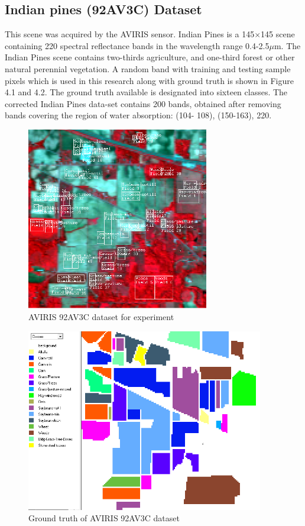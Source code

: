 \documentclass[document.tex]{subfiles}
\begin{document}
\subsection{Indian pines (92AV3C) Dataset}
\noindent This scene was acquired by the AVIRIS sensor. Indian Pines is a 145$\times$145 scene containing
220 spectral reflectance bands in the wavelength range 0.4-2.5$\mu$m. The Indian Pines scene
contains two-thirds agriculture, and one-third forest or other natural perennial vegetation.
A random band with training and testing sample pixels which is used in this research along with ground truth is shown in Figure 4.1 and 4.2. The ground truth
available is designated into sixteen classes. The corrected Indian Pines data-set contains
200 bands, obtained after removing bands covering the region of water absorption: (104-
108), (150-163), 220.
\begin{figure}[H]
	\begin{center}
		\includegraphics[height=8.0cm]{imgs/Dataset.png}
	\end{center}
	\caption{AVIRIS 92AV3C dataset for experiment}
	\label{fig:AVIRIS 92AV3C dataset for experiment}
\end{figure}

\begin{figure}[H]
	\begin{center}
		\includegraphics[height=8.0cm]{imgs/Ground.png}
	\end{center}
	\caption{Ground truth of AVIRIS 92AV3C dataset}
	\label{fig:Ground truth of AVIRIS 92AV3C dataset}
\end{figure}
\end{document}
